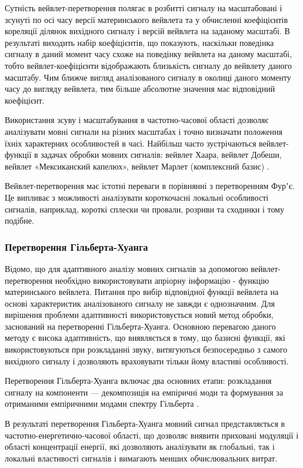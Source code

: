 Сутність вейвлет-перетворення полягає в розбитті сигналу на масштабовані і зсунуті по осі часу версії материнського вейвлета та у обчисленні коефіцієнтів кореляції ділянок вихідного сигналу і версій вейвлета на заданому масштабі. В результаті виходить набір коефіцієнтів, що показують, наскільки поведінка сигналу в даний момент часу схоже на поведінку вейвлета на даному масштабі, тобто вейвлет-коефіцієнти відображають близькість сигналу до вейвлету даного масштабу. Чим ближче вигляд аналізованого сигналу в околиці даного моменту часу до вигляду вейвлета, тим більше абсолютне значення має відповідний коефіцієнт.

Використання зсуву і масштабування в частотно-часової області дозволяє аналізувати мовні сигнали на різних масштабах і точно визначати положення їхніх характерних особливостей в часі. Найбільш часто зустрічаються вейвлет-функції в задачах обробки мовних сигналів: вейвлет Хаара, вейвлет Добеши, вейвлет «Мексиканский капелюх», вейвлет Марлет (комплексний базис) \cite{Майдан_2007}.

Вейвлет-перетворення має істотні переваги в порівнянні з перетворенням Фурʼє. Це випливає з можливості аналізувати короткочасні локальні особливості сигналів, наприклад, короткі сплески чи провали, розриви та сходинки і тому подібне.

\subsubsection{Перетворення Гільберта-Хуанга}

Відомо, що для адаптивного аналізу мовних сигналів за допомогою вейвлет-перетворення необхідно використовувати апріорну інформацію - функцію материнського вейвлета. Питання про вибір відповідної функції вейвлета на основі характеристик аналізованого сигналу не завжди є однозначним. Для вирішення проблеми адаптивності використовується новий метод обробки, заснований на перетворенні Гільберта-Хуанга. Основною перевагою даного методу є висока адаптивність, що виявляється в тому, що базисні функції, які використовуються при розкладанні звуку, витягуються безпосередньо з самого вихідного сигналу і дозволяють враховувати тільки йому властиві особливості.

Перетворення Гільберта-Хуанга включає два основних етапи: розкладання сигналу на компоненти --- декомпозиція на емпіричні моди \cite{Huang_1998,Tychkov_2013} та формування за отриманими емпіричними модами спектру Гільберта \cite{Huang_2013}.

В результаті перетворення Гільберта-Хуанга мовний сигнал представляється в частотно-енергетично-часової області, що дозволяє виявити приховані модуляції і області концентрації енергії, які дозволяють аналізувати як глобальні, так і локальні властивості сигналів і вимагають менших обчислювальних витрат.

